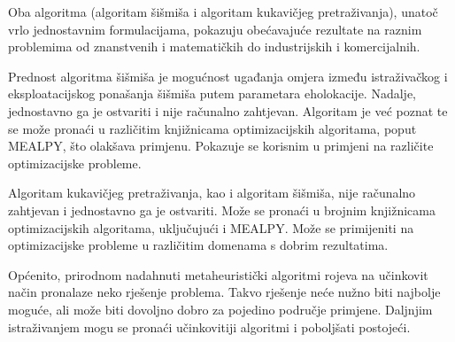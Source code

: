 

\hspace{0.5cm}Oba algoritma (algoritam šišmiša i algoritam kukavičjeg pretraživanja), unatoč vrlo jednostavnim formulacijama, pokazuju obećavajuće rezultate na raznim problemima od znanstvenih i matematičkih do industrijskih i komercijalnih.

\hspace{0.5cm} Prednost algoritma šišmiša je mogućnost ugađanja omjera između istraživačkog i eksploatacijskog ponašanja šišmiša putem parametara eholokacije. Nadalje, jednostavno ga je ostvariti i nije računalno zahtjevan. Algoritam je već poznat te se može pronaći u različitim knjižnicama optimizacijskih algoritama, poput MEALPY, što olakšava primjenu. Pokazuje se korisnim u primjeni na različite optimizacijske probleme. 


\hspace{0.5cm} Algoritam kukavičjeg pretraživanja, kao i algoritam šišmiša, nije računalno zahtjevan i jednostavno ga je ostvariti. Može se pronaći u brojnim knjižnicama optimizacijskih algoritama, uključujući i MEALPY. Može se primijeniti na optimizacijske probleme u različitim domenama s dobrim rezultatima. 



\hspace{0.5cm}Općenito, prirodnom nadahnuti metaheuristički algoritmi rojeva na učinkovit način pronalaze neko rješenje problema. Takvo rješenje neće nužno biti najbolje moguće, ali može biti dovoljno dobro za pojedino područje primjene. Daljnjim istraživanjem mogu se pronaći učinkovitiji algoritmi i poboljšati postojeći.